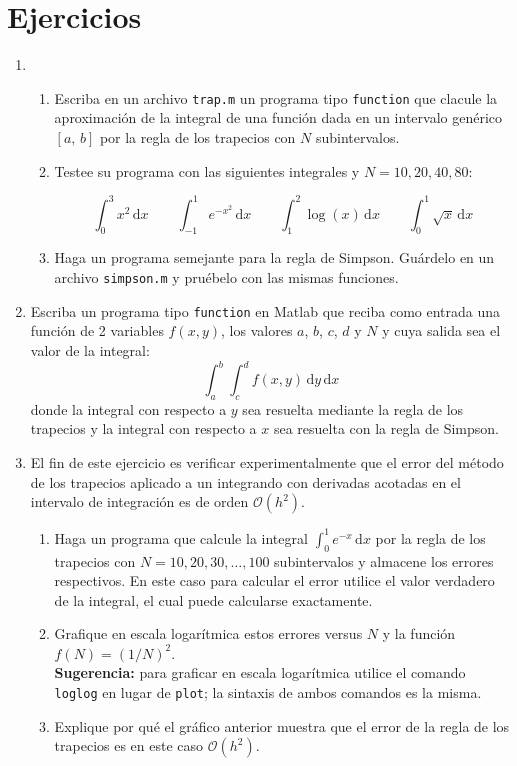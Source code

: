 \documentclass[letterpaper,11pt]{article}
\newcommand{\matlab}{{\sc Matlab} }
\begin{document}
\section{Ejercicios}
\begin{enumerate}
\item
\begin{enumerate}
\item Escriba en un archivo \texttt{trap.m} un programa tipo \texttt{function} que clacule la aproximaci\'on de la integral de una funci\'on dada en un intervalo gen\'erico $[a,\,b]$ por la regla de los trapecios con $N$ subintervalos.

\item Testee su programa con las siguientes integrales y $N=10, 20, 40, 80$:

$$\int_0^3 x^2\,\mathrm{d}x\qquad\int_{-1}^1 e^{-x^2}\,\mathrm{d}x\qquad\int_1^2 \log(x)\,\mathrm{d}x\qquad\int_0^1 \sqrt{x}\,\mathrm{d}x$$

\item Haga un programa semejante para la regla de Simpson. Gu\'ardelo en un archivo \texttt{simpson.m} y pru\'ebelo con las mismas funciones.
\end{enumerate}

\item Escriba un programa tipo \texttt{function} en \matlab que reciba como entrada una funci\'on de 2 variables $f(x,y)$, los valores $a$, $b$, $c$, $d$ y $N$ y cuya salida sea el valor de la integral:
$$
\int_a^b\int_c^d f(x,y)\,\mathrm{d}y\,\mathrm{d}x
$$
donde la integral con respecto a $y$ sea resuelta mediante la regla de los trapecios y la integral con respecto a $x$ sea resuelta con la regla de Simpson.

\item El fin de este ejercicio es verificar experimentalmente que el error del m\'etodo de los trapecios
aplicado a un integrando con derivadas acotadas en el intervalo de integraci\'on es de orden $\mathcal{O}(h^2)$.

\begin{enumerate}
\item Haga un programa que calcule la integral $\int_0^1e^{-x}\,\mathrm{d}x$ por la regla de los trapecios con $N =
10,20,30,\ldots,100$ subintervalos y almacene los errores respectivos. En este caso para calcular el error utilice el valor verdadero de la integral, el cual puede calcularse exactamente.
\item Grafique en escala logar\'itmica estos errores versus $N$ y la funci\'on $f(N) = (1/N)^{2}$.\\
\textbf{Sugerencia:} para graficar en escala logar\'itmica utilice el comando \verb+loglog+ en lugar de \verb+plot+;
la sintaxis de ambos comandos es la misma.
\item Explique por qu\'e el gr\'afico anterior muestra que el error de la regla de los trapecios es en este
caso $\mathcal{O}(h^2)$.
\end{enumerate}


\end{enumerate}
\end{document}
